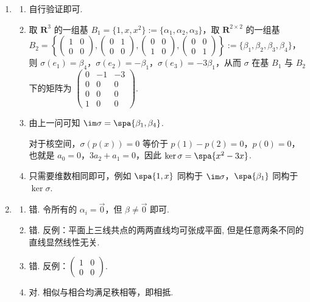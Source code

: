 \begin{enumerate}
    \item \begin{enumerate}
        \item 自行验证即可.
        \item 取 $\mathbf{R}^3$ 的一组基 $B_1=\{1,x,x^2\}:=\{\alpha_1,\alpha_2,\alpha_3\}$，取 $\mathbf{R}^{2 \times 2}$ 的一组基 $B_2=\left\{\begin{pmatrix}
            1 & 0 \\ 0 & 0
        \end{pmatrix}, \begin{pmatrix}
            0 & 1 \\ 0 & 0
        \end{pmatrix}, \begin{pmatrix}
            0 & 0 \\ 1 & 0
        \end{pmatrix}, \begin{pmatrix}
            0 & 0 \\ 0 & 1
        \end{pmatrix}\right\}:=\{\beta_1,\beta_2,\beta_3,\beta_4\}$，则 $\sigma(e_1) = \beta_4$，$\sigma(e_2) = -\beta_1$，$\sigma(e_3) = -3\beta_1$，从而 $\sigma$ 在基 $B_1$ 与 $B_2$ 下的矩阵为 $\begin{pmatrix}
            0 & -1 & -3 \\
            0 & 0 & 0 \\
            0 & 0 & 0 \\
            1 & 0 & 0
        \end{pmatrix}$.
        \item 由上一问可知 $\im\sigma = \spa\{\beta_1,\beta_4\}$.

        对于核空间，$\sigma(p(x))=0$ 等价于 $p(1)-p(2)=0$，$p(0)=0$，也就是 $a_0=0$，$3a_2+a_1=0$，因此 $\ker\sigma = \spa\{x^2-3x\}$.

        \item 只需要维数相同即可，例如 $\spa\{1,x\}$ 同构于 $\im\sigma$，$\spa\{\beta_1\}$ 同构于 $\ker\sigma$.
    \end{enumerate}

    \item \begin{enumerate}
        \item 错. 令所有的 $\alpha_i=\vec{0}$，但 $\beta \neq \vec{0}$ 即可.
        \item 错. 反例：平面上三线共点的两两直线均可张成平面, 但是任意两条不同的直线显然线性无关.
        \item 错. 反例：$\begin{pmatrix}
            1 & 0 \\
            0 & 0
        \end{pmatrix}$.
        \item 对. 相似与相合均满足秩相等，即相抵.
    \end{enumerate}
\end{enumerate}

\clearpage
